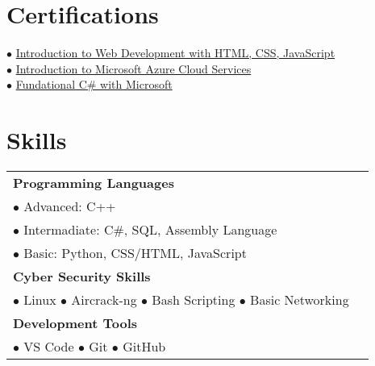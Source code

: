 \documentclass[a4paper,12pt]{article}
\begin{document}
\section{Certifications}
$\bullet$ \href{https://coursera.org/share/219dc4c656cd4114416bdb36af064e2a}{Introduction to Web Development with HTML, CSS, JavaScript}\\
$\bullet$ \href{https://coursera.org/share/3c380cf6e3a7f9913eeedc4b92bd9193}{Introduction to Microsoft Azure Cloud Services}\\
$\bullet$ \href{https://www.freecodecamp.org/certification/fcc22eeb458-904a-4ff3-9146-5291855407a8/foundational-c-sharp-with-microsoft}{Fundational C\# with Microsoft}
\section{Skills}
\begin{tabularx} {\linewidth}{@{}l X@{}}
\textbf{Programming Languages} & \\
$\bullet$ Advanced: C++ \\
$\bullet$ Intermadiate: C\#, SQL, Assembly Language \\
$\bullet$ Basic: Python, CSS/HTML, JavaScript \\
\textbf{Cyber Security Skills} & \\
$\bullet$ Linux \hspace{10pt} $\bullet$ Aircrack-ng \hspace{10pt} $\bullet$ Bash Scripting \hspace{10pt} $\bullet$ Basic Networking \\
\textbf{Development Tools}  & \\
$\bullet$ VS Code \hspace{20pt} $\bullet$ Git \hspace{20pt} $\bullet$ GitHub \\
\end{tabularx}
\end{document}
